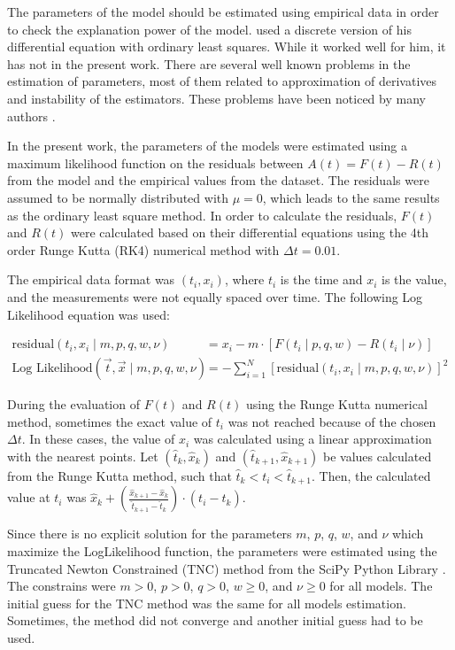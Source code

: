 The parameters of the model should be estimated using empirical data in order to check the explanation power of the model. \citet{bass1969} used a discrete version of his differential equation with ordinary least squares. While it worked well for him, it has not in the present work. There are several well known problems in the estimation of parameters, most of them related to approximation of derivatives and instability of the estimators. These problems have been noticed by many authors \citep{schmittlein1982maximum, srinivasan1986technical, xie1997kalman}.

In the present work, the parameters of the models were estimated using a maximum likelihood function on the residuals between $A(t) = F(t) - R(t)$ from the model and the empirical values from the dataset. The residuals were assumed to be normally distributed with $\mu=0$, which leads to the same results as the ordinary least square method. In order to calculate the residuals, $F(t)$ and $R(t)$ were calculated based on their differential equations using the 4th order Runge Kutta (RK4) numerical method \citep{butcher1987numerical} with $\Delta t = 0.01$.

The empirical data format was $(t_i, x_i)$, where $t_i$ is the time and $x_i$ is the value, and the measurements were not equally spaced over time. The following Log Likelihood equation was used:

\begin{align}
\text{residual}(t_i, x_i \mid m, p, q, w, \nu) &= x_i - m \cdot \left[ F(t_i \mid p, q, w) - R(t_i \mid \nu) \right] \\
\text{Log Likelihood}(\vec{t}, \vec{x} \mid m, p, q, w, \nu) &= -\sum_{i=1}^{N} [\text{residual}(t_i, x_i \mid m, p, q, w, \nu)]^2
\end{align}

During the evaluation of $F(t)$ and $R(t)$ using the Runge Kutta numerical method, sometimes the exact value of $t_i$ was not reached because of the chosen $\Delta t$. In these cases, the value of $x_i$ was calculated using a linear approximation with the nearest points. Let $(\hat{t}_k, \hat{x}_k)$ and $(\hat{t}_{k+1}, \hat{x}_{k+1})$ be values calculated from the Runge Kutta method, such that $\hat{t}_k < t_i < \hat{t}_{k+1}$. Then, the calculated value at $t_i$ was $\hat{x}_k + \left( \frac{\hat{x}_{k+1} - \hat{x}_k}{\hat{t}_{k+1} - \hat{t}_k} \right) \cdot (t_i - \hat{t}_k)$.

Since there is no explicit solution for the parameters $m$, $p$, $q$, $w$, and $\nu$ which maximize the LogLikelihood function, the parameters were estimated using the Truncated Newton Constrained (TNC) method \citep{dembo1983truncated, nash2000survey, nash1984newton} from the SciPy Python Library \citep{scipy}. The constrains were $m > 0$, $p > 0$, $q > 0$, $w \geq 0$, and $\nu \geq 0$ for all models. The initial guess for the TNC method was the same for all models estimation. Sometimes, the method did not converge and another initial guess had to be used.


